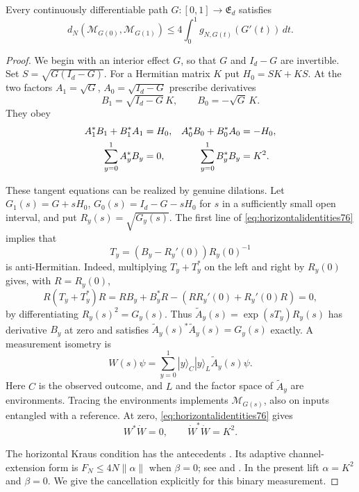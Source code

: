 \begin{lemma}
\label{lem:matrixpath76}
Every continuously differentiable path $G:[0,1]\to\mathfrak E_d$
satisfies
\begin{equation}\label{eq:matrixpath76}
 d_N(\mathcal M_{G(0)},\mathcal M_{G(1)})
       \le4\int_0^1 g_{N,G(t)}(G'(t))\,dt.
\end{equation}
\end{lemma}
\begin{proof}
We begin with an interior effect $G$, so that $G$ and $I_d-G$
are invertible.  Set $S=\sqrt{G(I_d-G)}$.  For a Hermitian matrix
$K$ put $H_0=SK+KS$.  At the two factors
$A_1=\sqrt G$, $A_0=\sqrt{I_d-G}$ prescribe derivatives
\begin{equation}\label{eq:horizontalderivatives76}
 B_1=\sqrt{I_d-G}\,K,\qquad B_0=-\sqrt G\,K.
\end{equation}
They obey
\begin{align}
 A_1^*B_1+B_1^*A_1&=H_0,&
 A_0^*B_0+B_0^*A_0&=-H_0,\notag\\
 \sum_{y=0}^1 A_y^*B_y&=0,&
 \sum_{y=0}^1 B_y^*B_y&=K^2.
                                      \label{eq:horizontalidentities76}
\end{align}

These tangent equations can be realized by genuine dilations.
Let $G_1(s)=G+sH_0$, $G_0(s)=I_d-G-sH_0$ for $s$ in a
sufficiently small open interval, and put $R_y(s)=\sqrt{G_y(s)}$.
The first line of \eqref{eq:horizontalidentities76} implies that
\[
 T_y=(B_y-R_y'(0))R_y(0)^{-1}
\]
is anti-Hermitian.  Indeed, multiplying $T_y+T_y^*$ on the left
and right by $R_y(0)$ gives, with $R=R_y(0)$,
\[
 R(T_y+T_y^*)R=RB_y+B_y^*R-(RR_y'(0)+R_y'(0)R)=0,
\]
by differentiating $R_y(s)^2=G_y(s)$.  Thus
$\widetilde A_y(s)=\exp(sT_y)R_y(s)$ has derivative $B_y$ at
zero and satisfies
$\widetilde A_y(s)^*\widetilde A_y(s)=G_y(s)$ exactly.  A measurement
isometry is
\[
 W(s)\psi=\sum_{y=0}^1
              |y\rangle_C|y\rangle_L\widetilde A_y(s)\psi.
\]
Here $C$ is the observed outcome, and $L$ and the factor space of
$\widetilde A_y$ are environments.  Tracing the environments
implements $\mathcal M_{G(s)}$, also on inputs entangled with a
reference.  At zero, \eqref{eq:horizontalidentities76} gives
\begin{equation}\label{eq:horizontaloverlap76}
 W^*\dot W=0,\qquad \dot W^*\dot W=K^2.
\end{equation}

The horizontal Kraus condition has the antecedents
\cite[Theorems~4--5]{FI76}. Its adaptive channel-extension form is
$F_N\le4N\|\alpha\|$ when $\beta=0$; see
\cite[equation~(9)]{DM76} and \cite[equations~(5)--(10)]{KGAD76}.
In the present lift $\alpha=K^2$ and $\beta=0$. We give the cancellation
explicitly for this binary measurement.


\end{proof}
